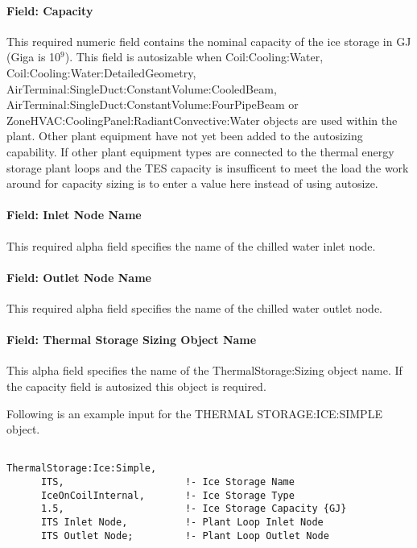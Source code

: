 \paragraph{Field: Capacity}\label{field-capacity-000}

This required numeric field contains the nominal capacity of the ice storage in GJ (Giga is 10\(^{9}\)). This field is autosizable when Coil:Cooling:Water, Coil:Cooling:Water:DetailedGeometry, AirTerminal:SingleDuct:ConstantVolume:CooledBeam, AirTerminal:SingleDuct:ConstantVolume:FourPipeBeam or ZoneHVAC:CoolingPanel:RadiantConvective:Water objects are used within the plant. Other plant equipment have not yet been added to the autosizing capability. If other plant equipment types are connected to the thermal energy storage plant loops and the TES capacity is insufficent to meet the load the work around for capacity sizing is to enter a value here instead of using autosize.

\paragraph{Field: Inlet Node Name}\label{field-inlet-node-name-004}

This required alpha field specifies the name of the chilled water inlet node.

\paragraph{Field: Outlet Node Name}\label{field-outlet-node-name-005}

This required alpha field specifies the name of the chilled water outlet node.

\paragraph{Field: Thermal Storage Sizing Object Name}\label{field-thermal-storage-sizing-object-name-001}

This alpha field specifies the name of the ThermalStorage:Sizing object name. If the capacity field is autosized this object is required.

Following is an example input for the THERMAL STORAGE:ICE:SIMPLE object.

\begin{lstlisting}

ThermalStorage:Ice:Simple,
      ITS,                     !- Ice Storage Name
      IceOnCoilInternal,       !- Ice Storage Type
      1.5,                     !- Ice Storage Capacity {GJ}
      ITS Inlet Node,          !- Plant Loop Inlet Node
      ITS Outlet Node;         !- Plant Loop Outlet Node
\end{lstlisting}

